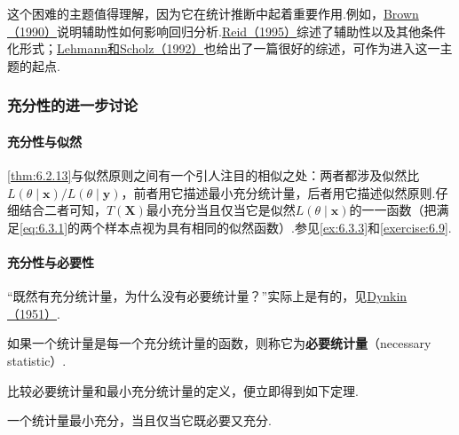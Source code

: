 这个困难的主题值得理解，因为它在统计推断中起着重要作用.例如，\hyperref[bib:source52]{Brown（1990）}说明辅助性如何影响回归分析.\hyperref[bib:source250]{Reid（1995）}综述了辅助性以及其他条件化形式；\hyperref[bib:source202]{Lehmann和Scholz（1992）}也给出了一篇很好的综述，可作为进入这一主题的起点.
\subsubsection{充分性的进一步讨论}\label{sec:6.6.3}
\paragraph{充分性与似然}
\autoref{thm:6.2.13}与似然原则之间有一个引人注目的相似之处：两者都涉及似然比$L(\theta\mid\boldsymbol x)/L(\theta\mid\boldsymbol y)$，前者用它描述最小充分统计量，后者用它描述似然原则.仔细结合二者可知，$T(\boldsymbol X)$最小充分当且仅当它是似然$L(\theta\mid\boldsymbol x)$的一一函数（把满足\eqref{eq:6.3.1}的两个样本点视为具有相同的似然函数）.参见\autoref{ex:6.3.3}和\autoref{exercise:6.9}.
\paragraph{充分性与必要性}
“既然有充分统计量，为什么没有必要统计量？”实际上是有的，见\hyperref[bib:source104]{Dynkin（1951）}.
\begin{definition}\label{def:6.6.3}
如果一个统计量是每一个充分统计量的函数，则称它为\textbf{必要统计量}（necessary statistic）.
\end{definition}
比较必要统计量和最小充分统计量的定义，便立即得到如下定理.
\begin{theorem}\label{thm:6.6.4}
一个统计量最小充分，当且仅当它既必要又充分.
\end{theorem}
